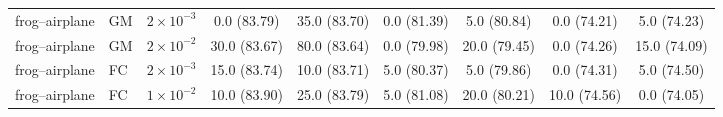 \begin{table}[t]
{\begin{tabular}{lllcccccc}
\midrule

frog--airplane & GM &
$2{\times}10^{-3}$ &
0.0 \small{(83.79)} & 35.0 \small{(83.70)} & 0.0 \small{(81.39)} & 5.0 \small{(80.84)} & 0.0 \small{(74.21)} & 5.0 \small{(74.23)} \\

frog--airplane & GM &
$2{\times}10^{-2}$ &
30.0 \small{(83.67)} & 80.0 \small{(83.64)} & 0.0 \small{(79.98)} & 20.0 \small{(79.45)} & 0.0 \small{(74.26)} & 15.0 \small{(74.09)} \\

frog--airplane & FC &
$2{\times}10^{-3}$ &
15.0 \small{(83.74)} & 10.0 \small{(83.71)} & 5.0 \small{(80.37)} & 5.0 \small{(79.86)} & 0.0 \small{(74.31)} & 5.0 \small{(74.50)} \\

frog--airplane & FC &
$1{\times}10^{-2}$ &
10.0 \small{(83.90)} & 25.0 \small{(83.79)} & 5.0 \small{(81.08)} & 20.0 \small{(80.21)} & 10.0 \small{(74.56)} & 0.0 \small{(74.05)} \\

\bottomrule
\end{tabular}
}
\end{table}

